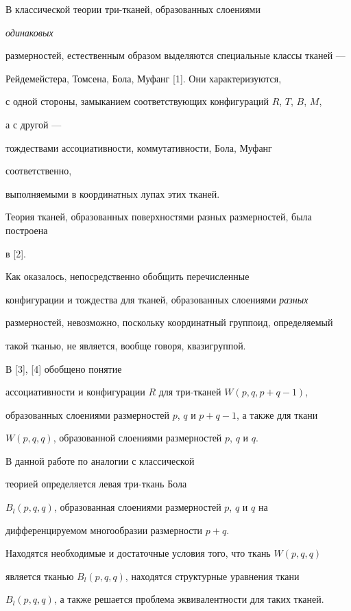 В классической теории три-тканей, образованных слоениями


{\it одинаковых}


размерностей, естественным образом выделяются специальные классы тканей ---


Рейдемейстера, Томсена, Бола, Муфанг [1]. Они характеризуются,


с одной стороны, замыканием соответствующих конфигураций $R$, $T$, $B$, $M$,


а с другой ---


тождествами ассоциативности, коммутативности, Бола, Муфанг


соответственно,


выполняемыми в координатных лупах этих тканей.





Теория тканей, образованных поверхностями разных размерностей, была построена


в [2].


Как оказалось, непосредственно обобщить перечисленные


конфигурации и тождества для тканей, образованных слоениями {\it разных}


размерностей, невозможно, поскольку координатный группоид, определяемый


такой тканью, не является, вообще говоря, квазигруппой.


В [3], [4] обобщено понятие


ассоциативности и конфигурации $R$ для три-тканей $W(p,q,p+q-1)$,


образованных слоениями размерностей $p$, $q$ и $p+q-1$, а также для ткани


$W(p,q,q)$, образованной слоениями размерностей $p$, $q$ и $q$.





В данной работе по аналогии с классической


теорией определяется левая три-ткань Бола


$B_{l}(p,q,q)$, образованная слоениями размерностей $p$, $q$ и $q$ на


дифференцируемом многообразии размерности $p+q$.


Находятся необходимые и достаточные условия того, что ткань $W(p,q,q)$


является тканью $B_{l}(p,q,q)$,  находятся структурные уравнения ткани


$B_{l}(p,q,q)$, а также решается проблема эквивалентности для таких тканей.


